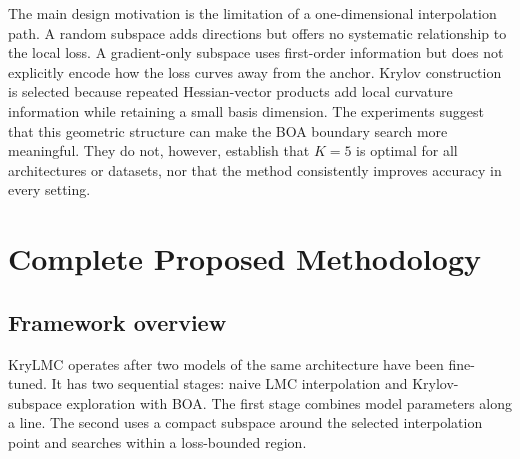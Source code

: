 \documentclass[11pt,a4paper]{article}
\begin{document}
The main design motivation is the limitation of a one-dimensional interpolation path. A random subspace adds directions but offers no systematic relationship to the local loss. A gradient-only subspace uses first-order information but does not explicitly encode how the loss curves away from the anchor. Krylov construction is selected because repeated Hessian-vector products add local curvature information while retaining a small basis dimension. The experiments suggest that this geometric structure can make the BOA boundary search more meaningful. They do not, however, establish that $K=5$ is optimal for all architectures or datasets, nor that the method consistently improves accuracy in every setting.

\section{Complete Proposed Methodology}

\subsection{Framework overview}
KryLMC operates after two models of the same architecture have been fine-tuned. It has two sequential stages: naive LMC interpolation and Krylov-subspace exploration with BOA. The first stage combines model parameters along a line. The second uses a compact subspace around the selected interpolation point and searches within a loss-bounded region.
\end{document}
